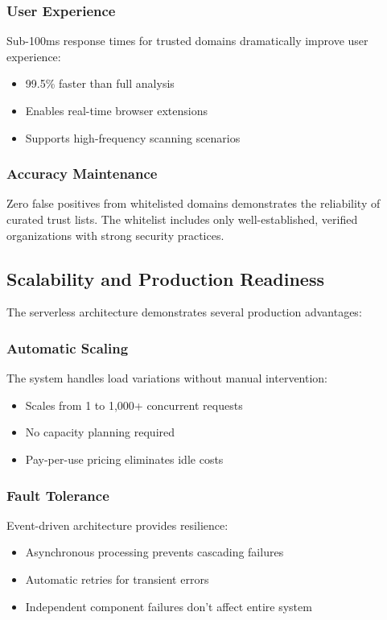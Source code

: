 \documentclass[conference]{IEEEtran}
\begin{document}
\subsubsection{User Experience}

Sub-100ms response times for trusted domains dramatically improve user experience:
\begin{itemize}
\item 99.5\% faster than full analysis
\item Enables real-time browser extensions
\item Supports high-frequency scanning scenarios
\end{itemize}

\subsubsection{Accuracy Maintenance}

Zero false positives from whitelisted domains demonstrates the reliability of curated trust lists. The whitelist includes only well-established, verified organizations with strong security practices.


\subsection{Scalability and Production Readiness}

The serverless architecture demonstrates several production advantages:

\subsubsection{Automatic Scaling}

The system handles load variations without manual intervention:
\begin{itemize}
\item Scales from 1 to 1,000+ concurrent requests
\item No capacity planning required
\item Pay-per-use pricing eliminates idle costs
\end{itemize}

\subsubsection{Fault Tolerance}

Event-driven architecture provides resilience:
\begin{itemize}
\item Asynchronous processing prevents cascading failures
\item Automatic retries for transient errors
\item Independent component failures don't affect entire system
\end{itemize}
\end{document}
